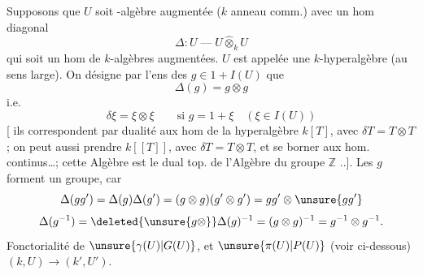 
Supposons que $U$ soit   -algèbre
augmentée ($k$ anneau comm.) avec un
hom diagonal
\[
\Delta:U\;\text{---}\;U\widehat\otimes_k U
\]
qui soit un hom de $k$-algèbres augmentées.
$U$ est appelée une $k$-hyperalgèbre  (au sens
large). On désigne par
 
 l'ens
des $g\in1+I(U)$   que
\[
\Delta(g)=g\otimes g
\]
i.e.
\[
\delta\xi=\xi\otimes\xi\qquad\text{si }g=1+\xi\quad(\xi\in I(U))
\]
[ ils correspondent par dualité aux
hom de la hyperalgèbre 
$k[T]$, avec $\delta T=T\otimes T$ ; on peut aussi
prendre $k[[T]]$, avec $\delta T=T\otimes T$, et
se borner aux hom. continus\ldots ;
cette Algèbre est le dual top. de
l'Algèbre du groupe $\mathbb Z$ ..].  Les
$g$ forment un groupe, car
\[
\Delta(gg')=\Delta(g)\Delta(g')=(g\otimes g)(g'\otimes g')
=gg'\otimes\unsure{gg'}
\]
\[
\Delta(g^{-1})=\deleted{\unsure{g\otimes}}\Delta(g)^{-1}
=(g\otimes g)^{-1}=g^{-1}\otimes g^{-1}.
\]
Fonctorialité de $\unsure{\gamma(U)|G(U)}$, et $\unsure{\pi(U)|P(U)}$
(voir ci-dessous)
 
$(k,U)\longrightarrow(k',U')$.

